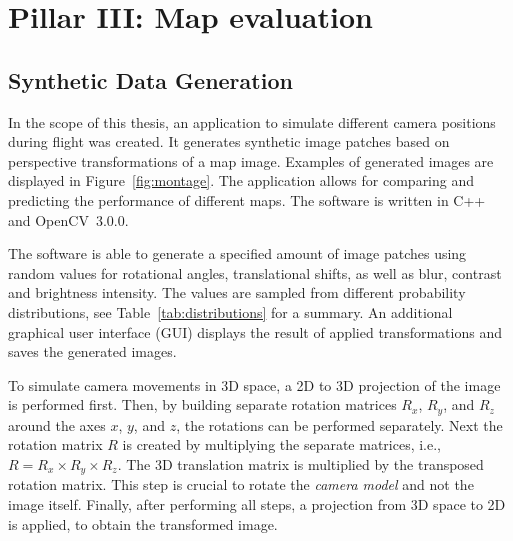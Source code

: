 \section{Pillar III: Map evaluation}
\label{sec:mapeval}

\subsection{Synthetic Data Generation}
\label{sec:syntheticdatageneration}

In the scope of this thesis, an application to simulate different
camera positions during flight was created. It generates synthetic
image patches based on perspective transformations of a map
image. Examples of generated images are displayed in
Figure~\ref{fig:montage}. The application allows for comparing and
predicting the performance of different maps. The software is written
in C++ and OpenCV~3.0.0.

The software is able to generate a specified amount of image patches
using random values for rotational angles, translational shifts, as
well as blur, contrast and brightness intensity. The values are
sampled from different probability distributions, see
Table~\ref{tab:distributions} for a summary. An additional graphical
user interface (GUI) displays the result of applied transformations
and saves the generated images.

To simulate camera movements in 3D space, a 2D to 3D projection of the
image is performed first. Then, by building separate rotation matrices
$R_x$, $R_y$, and $R_z$ around the axes $x$, $y$, and $z$, the
rotations can be performed separately. Next the rotation matrix $R$ is
created by multiplying the separate matrices, i.e.,
$R = R_x \times R_y \times R_z$. The 3D translation matrix is
multiplied by the transposed rotation matrix. This step is crucial to
rotate the \emph{camera model} and not the image itself. Finally,
after performing all steps, a projection from 3D space to 2D is
applied, to obtain the transformed image.

